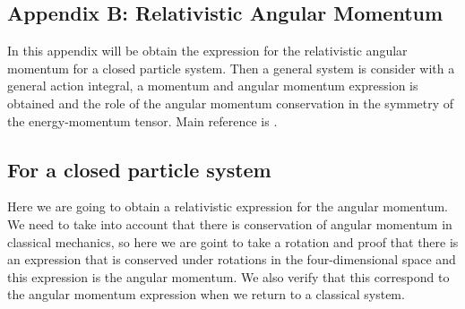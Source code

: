 \begin{appendix}
\chapter{Appendix B: Relativistic Angular Momentum}\label{appendix-momentum}
In this appendix will be obtain the expression for the relativistic angular momentum for a closed particle system. Then a general system is consider with a general action integral, a momentum and angular momentum expression is obtained and the role of the angular momentum conservation in the symmetry of the energy-momentum tensor. Main reference is \cite{LANDAU,DEWITT}.

\section{For a closed particle system}

Here we are going to obtain a relativistic expression for the angular
momentum. We need to take into account that there is conservation
of angular momentum in classical mechanics, so here we are goint to
take a rotation and proof that there is an expression that is conserved
under rotations in the four-dimensional space and this expression
is the angular momentum. We also verify that this correspond to the
angular momentum expression when we return to a classical system. 


\end{appendix}
